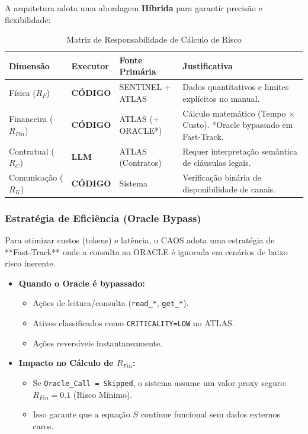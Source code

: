 \documentclass[12pt, a4paper]{article}
\begin{document}
A arquitetura adota uma abordagem \textbf{Híbrida} para garantir precisão e flexibilidade:

\begin{table}[h!]
\centering
\small
\begin{tabularx}{\textwidth}{|l|l|l|>{\raggedright\arraybackslash}X|}
\hline
\textbf{Dimensão} & \textbf{Executor} & \textbf{Fonte Primária} & \textbf{Justificativa} \\ \hline
Física ($R_F$) & \textbf{CÓDIGO} & SENTINEL + ATLAS & Dados quantitativos e limites explícitos no manual. \\ \hline
Financeira ($R_{Fin}$) & \textbf{CÓDIGO} & ATLAS (+ ORACLE*) & Cálculo matemático (Tempo $\times$ Custo). *Oracle bypassado em Fast-Track. \\ \hline
Contratual ($R_C$) & \textbf{LLM} & ATLAS (Contratos) & Requer interpretação semântica de cláusulas legais. \\ \hline
Comunicação ($R_K$) & \textbf{CÓDIGO} & Sistema & Verificação binária de disponibilidade de canais. \\ \hline
\end{tabularx}
\caption{Matriz de Responsabilidade de Cálculo de Risco}
\end{table}
\subsubsection{Estratégia de Eficiência (Oracle Bypass)}

Para otimizar custos (tokens) e latência, o CAOS adota uma estratégia de **Fast-Track** onde a consulta ao ORACLE é ignorada em cenários de baixo risco inerente.

\begin{itemize}
    \item \textbf{Quando o Oracle é bypassado:}
    \begin{itemize}
        \item Ações de leitura/consulta (\texttt{read\_*}, \texttt{get\_*}).
        \item Ativos classificados como \texttt{CRITICALITY=LOW} no ATLAS.
        \item Ações reversíveis instantaneamente.
    \end{itemize}
    \item \textbf{Impacto no Cálculo de $R_{Fin}$:}
    \begin{itemize}
        \item Se \texttt{Oracle\_Call = Skipped}, o sistema assume um valor proxy seguro: $R_{Fin} = 0.1$ (Risco Mínimo).
        \item Isso garante que a equação $S$ continue funcional sem dados externos caros.
    \end{itemize}
\end{itemize}
\newpage
\end{document}
